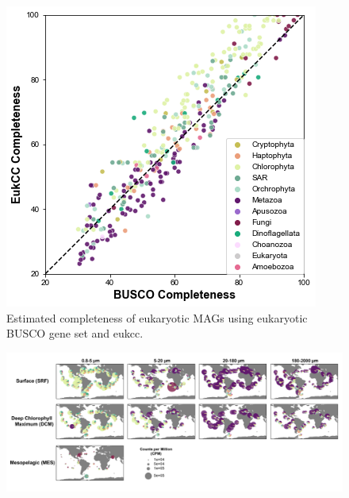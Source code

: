 \documentclass[12pt]{article}
\numberwithin{equation}{section}
\begin{document}
\begin{figure}
    \centering
    \includegraphics[width=0.8\columnwidth]{si-figures/HQ_BUSCO-EukCC-comp.png}
    \caption{Estimated completeness of eukaryotic MAGs using eukaryotic BUSCO gene set and eukcc.  }
    \label{fig:eukcc}
\end{figure}


\begin{landscape}
\begin{figure}
    \centering
    \includegraphics[width=0.95\columnwidth]{si-figures/Distribution-Map-Taxonomy-01.png}
    \caption{ }
    \label{fig:map}
\end{figure}
\end{landscape}
\end{document}
